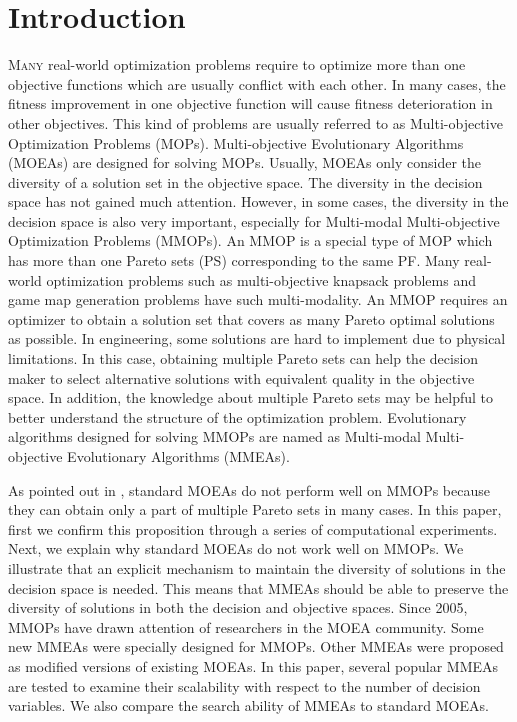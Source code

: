 \documentclass[conference]{IEEEtran}
\begin{document}
\section{Introduction}
\lettrine[lines=2]{M}{any} real-world optimization problems require to optimize more than one objective functions which are usually conflict with each other. In many cases, the fitness improvement in one objective function will cause fitness deterioration in other objectives. This kind of problems are usually referred to as Multi-objective Optimization Problems (MOPs). Multi-objective Evolutionary Algorithms (MOEAs) are designed for solving MOPs. Usually, MOEAs only consider the diversity of a solution set in the objective space. The diversity in the decision space has not gained much attention. However, in some cases, the diversity in the decision space is also very important, especially for Multi-modal Multi-objective Optimization Problems (MMOPs). An MMOP is a special type of MOP which has more than one Pareto sets (PS) corresponding to the same PF. Many real-world optimization problems such as multi-objective knapsack problems \cite{jaszkiewicz2002performance} and game map generation problems \cite{togelius2010towards} have such multi-modality. An MMOP requires an optimizer to obtain a solution set that covers as many Pareto optimal solutions as possible. In engineering, some solutions are hard to implement due to physical limitations. In this case, obtaining multiple Pareto sets can help the decision maker to select alternative solutions with equivalent quality in the objective space. In addition, the knowledge about multiple Pareto sets may be helpful to better understand the structure of the optimization problem\cite{deb2001multi}. Evolutionary algorithms designed for solving MMOPs are named as Multi-modal Multi-objective Evolutionary Algorithms (MMEAs).

As pointed out in \cite{tanabe2019review} \cite{liang2016multimodal}, standard MOEAs do not perform well on MMOPs because they can obtain only a part of multiple Pareto sets in many cases. In this paper, first we confirm this proposition through a series of computational experiments. Next, we explain why standard MOEAs do not work well on MMOPs. We illustrate that an explicit mechanism to maintain the diversity of solutions in the decision space is needed. This means that MMEAs should be able to preserve the diversity of solutions in both the decision and objective spaces. Since 2005, MMOPs have drawn attention of researchers in the MOEA community. Some new MMEAs were specially designed for MMOPs. Other MMEAs were proposed as modified versions of existing MOEAs. In this paper, several popular MMEAs are tested to examine their scalability with respect to the number of decision variables. We also compare the search ability of MMEAs to standard MOEAs.
\end{document}

